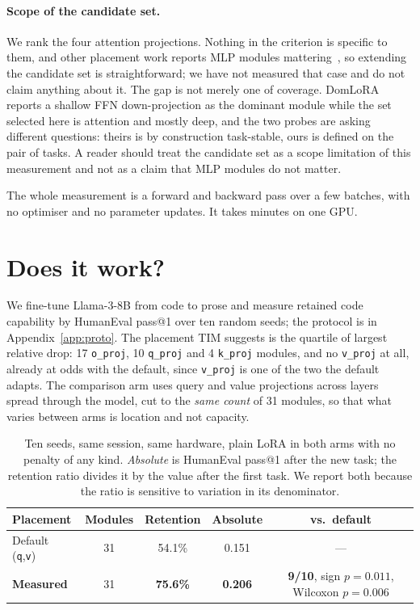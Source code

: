 \documentclass[11pt]{article}
\begin{document}
\paragraph{Scope of the candidate set.} We rank the four attention
projections. Nothing in the criterion is specific to them, and other placement
work reports MLP modules mattering~\cite{hayou2025,domlora2026}, so extending
the candidate set is straightforward; we have not measured that case and do not
claim anything about it. The gap is not merely one of coverage. DomLoRA reports
a shallow FFN down-projection as the dominant module while the set selected here
is attention and mostly deep, and the two probes are asking different questions:
theirs is by construction task-stable, ours is defined on the pair of tasks. A
reader should treat the candidate set as a scope limitation of this measurement
and not as a claim that MLP modules do not matter.

The whole measurement is a forward and backward pass over a few batches, with no
optimiser and no parameter updates. It takes minutes on one GPU.

\section{Does it work?}
\label{sec:work}

We fine-tune Llama-3-8B from code to prose and measure retained code capability
by HumanEval pass@1 over ten random seeds; the protocol is in
Appendix~\ref{app:proto}. The placement TIM suggests is the quartile of largest relative drop: 17 \texttt{o\_proj}, 10 \texttt{q\_proj} and 4 \texttt{k\_proj}
modules, and no \texttt{v\_proj} at all, already at odds with the default,
since \texttt{v\_proj} is one of the two the default adapts. The comparison arm
uses query and value projections across layers spread through the model, cut to
the \emph{same count} of 31 modules, so that what varies between arms is
location and not capacity.

\begin{table}[ht]
\centering
\caption{Ten seeds, same session, same hardware, plain LoRA in both arms with no
penalty of any kind. \emph{Absolute} is HumanEval pass@1 after the new task; the
retention ratio divides it by the value after the first task. We report both
because the ratio is sensitive to variation in its denominator.}
\label{tab:main}
\begin{tabular}{lcccc}
\toprule
Placement & Modules & Retention & Absolute & vs.\ default \\
\midrule
Default (\texttt{q},\texttt{v}) & 31 & 54.1\% & 0.151 & --- \\
\textbf{Measured} & 31 & \textbf{75.6\%} & \textbf{0.206} &
  \textbf{9/10}, sign $p{=}0.011$, Wilcoxon $p{=}0.006$ \\
\bottomrule
\end{tabular}
\end{table}
\end{document}
